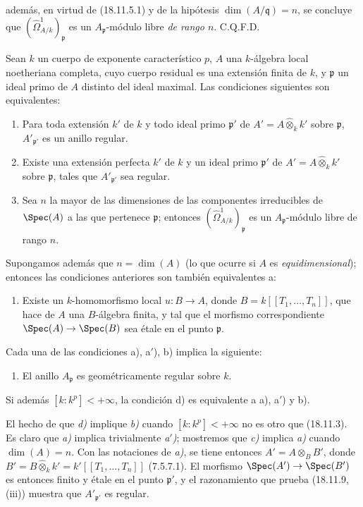 
además, en virtud de (18.11.5.1) y de la hipótesis $\dim(A/\mathfrak q)=n$, se concluye que $(\hat{\Omega}^1_{A/k})_{\mathfrak p}$ es un $A_{\mathfrak p}$-módulo libre \emph{de rango $n$}. C.Q.F.D.

\begin{theorem}[18.11.10]
\label{IV.18.11.10}
Sean $k$ un cuerpo de exponente característico $p$, $A$ una $k$-álgebra local noetheriana completa, cuyo cuerpo residual es una extensión finita de $k$, y $\mathfrak p$ un ideal primo de $A$ distinto del ideal maximal. Las condiciones siguientes son equivalentes:
\begin{enumerate}
  \item[\textup{a)}] Para toda extensión $k'$ de $k$ y todo ideal primo $\mathfrak p'$ de $A'=A\widehat{\otimes}_k k'$ sobre $\mathfrak p$, $A'_{\mathfrak p'}$ es un anillo regular.
  \item[\textup{a$'$)}] Existe una extensión \textup{perfecta} $k'$ de $k$ y un ideal primo $\mathfrak p'$ de $A'=A\widehat{\otimes}_k k'$ sobre $\mathfrak p$, tales que $A'_{\mathfrak p'}$ sea regular.
  \item[\textup{b)}] Sea $n$ la mayor de las dimensiones de las componentes irreducibles de $\Spec(A)$ a las que pertenece $\mathfrak p$; entonces $(\hat{\Omega}^1_{A/k})_{\mathfrak p}$ es un $A_{\mathfrak p}$-módulo libre de rango $n$.
\end{enumerate}
Supongamos además que $n=\dim(A)$ \textup{(lo que ocurre si $A$ es \emph{equidimensional})}; entonces las condiciones anteriores son también equivalentes a:
\begin{enumerate}
  \item[\textup{c)}] Existe un $k$-homomorfismo local $u:B\to A$, donde $B=k[[T_1,\ldots,T_n]]$, que hace de $A$ una $B$-álgebra finita, y tal que el morfismo correspondiente $\Spec(A)\to\Spec(B)$ sea étale en el punto $\mathfrak p$.
\end{enumerate}
Cada una de las condiciones \textup{a), a$'$), b)} implica la siguiente:
\begin{enumerate}
  \item[\textup{d)}] El anillo $A_{\mathfrak p}$ es geométricamente regular sobre $k$.
\end{enumerate}
Si además $[k:k^p]<+\infty$, la condición \textup{d)} es equivalente a \textup{a), a$'$)} y \textup{b)}.
\end{theorem}

El hecho de que \emph{d)} implique \emph{b)} cuando $[k:k^p]<+\infty$ no es otro que (18.11.3). Es claro que \emph{a)} implica trivialmente \emph{a$'$)}; mostremos que \emph{c)} implica \emph{a)} cuando $\dim(A)=n$. Con las notaciones de \emph{a)}, se tiene entonces
$A'=A\otimes_B B'$, donde $B'=B\widehat{\otimes}_k k'=k'[[T_1,\ldots,T_n]]$
(7.5.7.1). El morfismo $\Spec(A')\to\Spec(B')$ es entonces finito y étale en el punto $\mathfrak p'$, y el razonamiento que prueba (18.11.9, (iii)) muestra que $A'_{\mathfrak p'}$ es regular.

